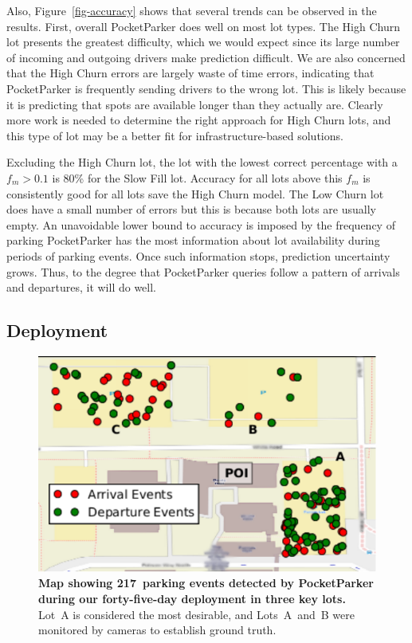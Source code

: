 Also, Figure~\ref{fig-accuracy} shows that several trends can be observed in
the results. First, overall PocketParker does well on most lot types. The
High Churn lot presents the greatest difficulty, which we would expect since
its large number of incoming and outgoing drivers make prediction difficult.
We are also concerned that the High Churn errors are largely waste of time
errors, indicating that PocketParker is frequently sending drivers to the
wrong lot. This is likely because it is predicting that spots are available
longer than they actually are. Clearly more work is needed to determine the
right approach for High Churn lots, and this type of lot may be a better fit
for infrastructure-based solutions.

Excluding the High Churn lot, the lot with the lowest correct percentage with
a $f_m > 0.1$ is 80\% for the Slow Fill lot.  Accuracy for all lots above
this $f_m$ is consistently good for all lots save the High Churn model.  The
Low Churn lot does have a small number of errors but this is because both
lots are usually empty. An unavoidable lower bound to accuracy is imposed by
the frequency of parking PocketParker has the most information about lot
availability during periods of parking events. Once such information stops,
prediction uncertainty grows. Thus, to the degree that PocketParker queries
follow a pattern of arrivals and departures, it will do well.

\newpage
\subsection{Deployment}

\begin{figure}
\centering
\includegraphics[width=\columnwidth]{./figures/smallEventsOnThreeParkingLot-anon.pdf}

\caption{\textbf{Map showing 217~parking events detected by PocketParker
during our forty-five-day deployment in three key lots.} Lot~A is considered
the most desirable, and Lots~A~and~B were monitored by cameras to establish
ground truth.}

\label{fig-events}
\vspace*{-0.15in}
\end{figure}

